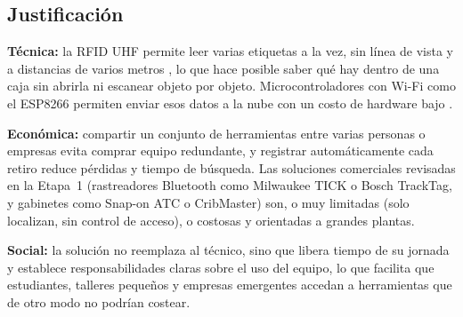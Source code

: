 \subsection{Justificación}
\textbf{Técnica:} la RFID UHF permite leer varias etiquetas a la vez, sin línea de vista y a distancias de varios metros \parencite{finkenzeller_rfid_2010}, lo que hace posible saber qué hay dentro de una caja sin abrirla ni escanear objeto por objeto. Microcontroladores con Wi-Fi como el ESP8266 permiten enviar esos datos a la nube con un costo de hardware bajo \parencite{gueye_pollution_2024}.

\textbf{Económica:} compartir un conjunto de herramientas entre varias personas o empresas evita comprar equipo redundante, y registrar automáticamente cada retiro reduce pérdidas y tiempo de búsqueda. Las soluciones comerciales revisadas en la Etapa~1 (rastreadores Bluetooth como Milwaukee TICK o Bosch TrackTag, y gabinetes como Snap-on ATC o CribMaster) son, o muy limitadas (solo localizan, sin control de acceso), o costosas y orientadas a grandes plantas.

\textbf{Social:} la solución no reemplaza al técnico, sino que libera tiempo de su jornada y establece responsabilidades claras sobre el uso del equipo, lo que facilita que estudiantes, talleres pequeños y empresas emergentes accedan a herramientas que de otro modo no podrían costear.
